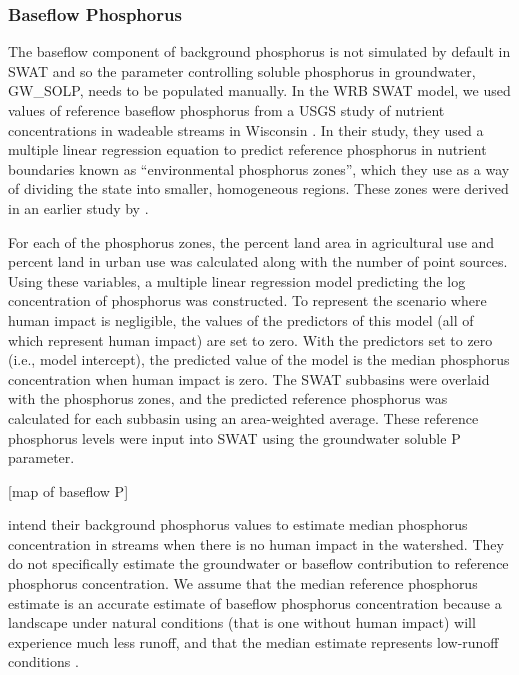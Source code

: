 \subsubsection{Baseflow Phosphorus}\label{sec:gwp}
	The baseflow component of background phosphorus is not simulated by default in SWAT and so the parameter controlling soluble phosphorus in groundwater, GW\_SOLP, needs to be populated manually. In the WRB SWAT model, we used values of reference baseflow phosphorus from a USGS study of nutrient concentrations in wadeable streams in Wisconsin \citet{robertson_wadeable_2006}. In their study, they used a multiple linear regression equation to predict reference phosphorus in nutrient boundaries known as ``environmental phosphorus zones'', which they use as a way of dividing the state into smaller, homogeneous regions. These zones were derived in an earlier study by \citet{robertson_phosphoruszones_2006}.
	
	For each of the phosphorus zones, the percent land area in agricultural use and percent land in urban use was calculated along with the number of point sources. Using these variables, a multiple linear regression model predicting the log concentration of phosphorus was constructed. To represent the scenario where human impact is negligible, the values of the predictors of this model (all of which represent human impact) are set to zero. With the predictors set to zero (i.e., model intercept), the predicted value of the model is the median phosphorus concentration when human impact is zero. The SWAT subbasins were overlaid with the phosphorus zones, and the predicted reference phosphorus was calculated for each subbasin using an area-weighted average. These reference phosphorus levels were input into SWAT using the groundwater soluble P parameter.
	
	[map of baseflow P]
	
	\citet{robertson_wadeable_2006} intend their background phosphorus values to estimate median phosphorus concentration in streams when there is no human impact in the watershed. They do not specifically estimate the groundwater or baseflow contribution to reference phosphorus concentration. We assume that the median reference phosphorus estimate is an accurate estimate of baseflow phosphorus concentration because a landscape under natural conditions (that is one without human impact) will experience much less runoff, and that the median estimate represents low-runoff conditions .
	
	
	
	
